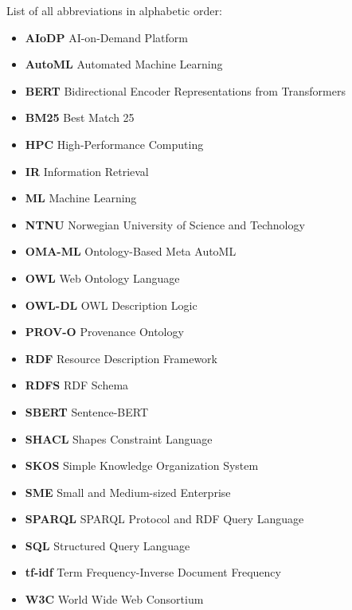 
List of all abbreviations in alphabetic order:

\begin{itemize}
    \item \textbf{AIoDP} AI-on-Demand Platform
    \item \textbf{AutoML} Automated Machine Learning
    \item \textbf{BERT} Bidirectional Encoder Representations from Transformers
    \item \textbf{BM25} Best Match 25
    \item \textbf{HPC} High-Performance Computing
    \item \textbf{IR} Information Retrieval
    \item \textbf{ML} Machine Learning
    \item \textbf{NTNU} Norwegian University of Science and Technology
    \item \textbf{OMA-ML} Ontology-Based Meta AutoML
    \item \textbf{OWL} Web Ontology Language
    \item \textbf{OWL-DL} OWL Description Logic
    \item \textbf{PROV-O} Provenance Ontology
    \item \textbf{RDF} Resource Description Framework
    \item \textbf{RDFS} RDF Schema
    \item \textbf{SBERT} Sentence-BERT
    \item \textbf{SHACL} Shapes Constraint Language
    \item \textbf{SKOS} Simple Knowledge Organization System
    \item \textbf{SME} Small and Medium-sized Enterprise
    \item \textbf{SPARQL} SPARQL Protocol and RDF Query Language
    \item \textbf{SQL} Structured Query Language
    \item \textbf{tf-idf} Term Frequency-Inverse Document Frequency
    \item \textbf{W3C} World Wide Web Consortium
\end{itemize}